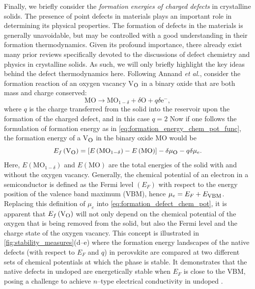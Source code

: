 Finally, we briefly consider the \textit{formation energies of charged defects}  in crystalline solids. The presence of point defects in materials plays an important role in determining its physical properties. The formation of defects in the materials is generally unavoidable, but may be controlled with a good understanding in their formation thermodynamics. Given its profound importance, there already exist many prior reviews specifically devoted to the discussions of defect chemistry and physics in crystalline solids.\cite{freysoldt2014first,anand2022convergent} As such, we will only briefly highlight the key ideas behind the defect thermodynamics here. Following Annand \emph{et al.}\cite{anand2022convergent}, consider the formation reaction of an oxygen vacancy V$_{\mbox{\footnotesize{O}}}$ in a binary oxide that are both mass and charge conserved:
\begin{equation*}
    \mbox{MO}\to\mbox{MO}_{1-\delta}+\delta \mbox{O} + q\delta \mbox{e}^{-},
\end{equation*}
where $q$ is the charge transferred from the solid into the reservoir upon the formation of the charged defect, and in this case $q=2$ Now if one follows the formulation of formation energy as in \cref{eq:formation_energy_chem_pot_func}, the  formation energy of a V$_{\mbox{\footnotesize{O}}}$ in the binary oxide MO would be
\begin{equation}\label{eq:formation_defect_chem_pot}
E_f\left(\mbox{V}_{\mbox{\footnotesize{O}}}\right)=\left[E\left(\mbox{MO}_{1-\delta}\right)-E\left(\mbox{MO}\right)\right]-\delta \mu_{\mbox{\footnotesize{O}}}-q\delta\mu_{e}.
\end{equation}
Here, $E\left(\mbox{MO}_{1-\delta}\right)$ and $E\left(\mbox{MO}\right)$ are the total energies of the solid with and without the oxygen vacancy. Generally, the chemical potential of an electron in a semiconductor is defined as the Fermi level $(E_F)$ with respect to the energy position of the valence band maximum (VBM), hence $\mu_e=E_{F}+E_{\mbox{\footnotesize{VBM}}}$. Replacing this definition of $\mu_e$ into \cref{eq:formation_defect_chem_pot}, it is apparent that $E_f\left(\mbox{V}_{\mbox{\footnotesize{O}}}\right)$ will not only depend on the chemical potential of the oxygen that is being removed from the solid, but also the Fermi level and the charge state of the oxygen vacancy. This concept is illustrated in \cref{fig:stability_measures}(d--e) where the formation energy landscapes of the native defects (with respect to $E_{F}$ and $q$) in perovskite  are compared at two different sets of chemical potentials at which the  phase is stable. It demonstrates that the native defects in undoped   are energetically stable when $E_{F}$ is close to the VBM, posing a challenge to achieve $n$--type electrical conductivity in undoped  .

